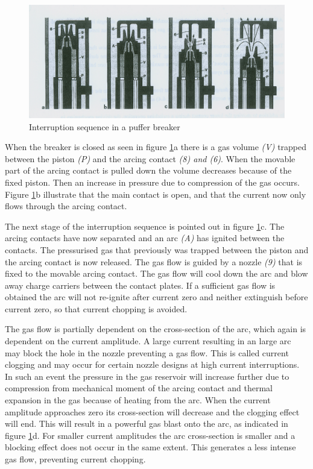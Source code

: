 \documentclass[10pt,a4paper]{article} %
\begin{document}
\begin{figure} [h]
\centering
\includegraphics[scale=0.8]{Bilder/Theory/CircutBreakPuff1.png}
\caption{Interruption sequence in a puffer breaker \cite{bib:HVEbreak}} \label{fig:CircutBreakPuff1}
\end{figure}

When the breaker is closed as seen in figure \ref{fig:CircutBreakPuff1}a there is a gas volume \textit{(V)} trapped between the piston \textit{(P)} and the arcing contact \textit{(8) and (6)}. When the movable part of the arcing contact is pulled down the volume decreases because of the fixed piston. Then an increase in pressure due to compression of the gas occurs. Figure \ref{fig:CircutBreakPuff1}b illustrate that the main contact is open, and that the current now only flows through the arcing contact.

The next stage of the interruption sequence is pointed out in figure \ref{fig:CircutBreakPuff1}c. The arcing contacts have now separated and an arc \textit{(A)} has ignited between the contacts. The pressurised gas that previously was trapped between the piston and the arcing contact is now released. The gas flow is guided by a nozzle \textit{(9)} that is fixed to the movable arcing contact. The gas flow will cool down the arc and blow away charge carriers between the contact plates. If a sufficient gas flow is obtained the arc will not re-ignite after current zero and neither extinguish before current zero, so that current chopping is avoided.

The gas flow is partially dependent on the cross-section of the arc, which again is dependent on the current amplitude. A large current resulting in an large arc may block the hole in the nozzle preventing a gas flow. This is called current clogging and may occur for certain nozzle designs at high current interruptions. In such an event the pressure in the gas reservoir will increase further due to compression from mechanical moment of the arcing contact and thermal expansion in the gas because of heating from the arc. When the current amplitude approaches zero its cross-section will decrease and the clogging effect will end. This will result in a powerful gas blast onto the arc, as indicated in figure \ref{fig:CircutBreakPuff1}d. For smaller current amplitudes the arc cross-section is smaller and a blocking effect does not occur in the same extent. This generates a less intense gas flow, preventing current chopping.
 
\end{document}
